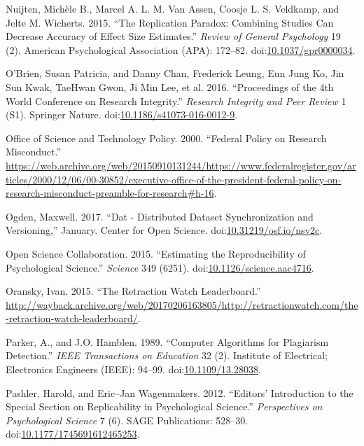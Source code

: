 \documentclass[a5paper]{book}
\begin{document}
\hypertarget{ref-doi:10.1037ux2fgpr0000034}{}
Nuijten, Michèle B., Marcel A. L. M. Van Assen, Coosje L. S. Veldkamp,
and Jelte M. Wicherts. 2015. ``The Replication Paradox: Combining
Studies Can Decrease Accuracy of Effect Size Estimates.'' \emph{Review
of General Psychology} 19 (2). American Psychological Association (APA):
172--82.
doi:\href{https://doi.org/10.1037/gpr0000034}{10.1037/gpr0000034}.

\hypertarget{ref-doi:10.1186ux2fs41073-016-0012-9}{}
O'Brien, Susan Patricia, and Danny Chan, Frederick Leung, Eun Jung Ko,
Jin Sun Kwak, TaeHwan Gwon, Ji Min Lee, et al. 2016. ``Proceedings of
the 4th World Conference on Research Integrity.'' \emph{Research
Integrity and Peer Review} 1 (S1). Springer Nature.
doi:\href{https://doi.org/10.1186/s41073-016-0012-9}{10.1186/s41073-016-0012-9}.

\hypertarget{ref-ostp2000}{}
Office of Science and Technology Policy. 2000. ``Federal Policy on
Research Misconduct.''
\url{https://web.archive.org/web/20150910131244/https://www.federalregister.gov/articles/2000/12/06/00-30852/executive-office-of-the-president-federal-policy-on-research-misconduct-preamble-for-research\#h-16}.

\hypertarget{ref-doi:10.31219ux2fosf.ioux2fnsv2c}{}
Ogden, Maxwell. 2017. ``Dat - Distributed Dataset Synchronization and
Versioning,'' January. Center for Open Science.
doi:\href{https://doi.org/10.31219/osf.io/nsv2c}{10.31219/osf.io/nsv2c}.

\hypertarget{ref-doi:10.1126ux2fscience.aac4716}{}
Open Science Collaboration. 2015. ``Estimating the Reproducibility of
Psychological Science.'' \emph{Science} 349 (6251).
doi:\href{https://doi.org/10.1126/science.aac4716}{10.1126/science.aac4716}.

\hypertarget{ref-oransky2015}{}
Oransky, Ivan. 2015. ``The Retraction Watch Leaderboard.''
\url{http://wayback.archive.org/web/20170206163805/http://retractionwatch.com/the-retraction-watch-leaderboard/}.

\hypertarget{ref-doi:10.1109ux2f13.28038}{}
Parker, A., and J.O. Hamblen. 1989. ``Computer Algorithms for Plagiarism
Detection.'' \emph{IEEE Transactions on Education} 32 (2). Institute of
Electrical; Electronics Engineers (IEEE): 94--99.
doi:\href{https://doi.org/10.1109/13.28038}{10.1109/13.28038}.

\hypertarget{ref-doi:10.1177ux2f1745691612465253}{}
Pashler, Harold, and Eric--Jan Wagenmakers. 2012. ``Editors'
Introduction to the Special Section on Replicability in Psychological
Science.'' \emph{Perspectives on Psychological Science} 7 (6). SAGE
Publications: 528--30.
doi:\href{https://doi.org/10.1177/1745691612465253}{10.1177/1745691612465253}.
\end{document}
